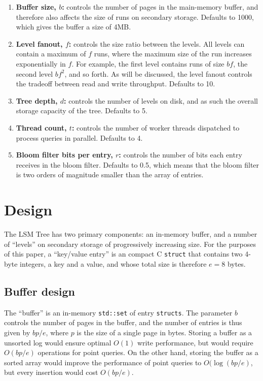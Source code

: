 \documentclass{acm}
\begin{document}
\begin{enumerate}
\item \textbf{Buffer size, $b$:} controls the number of pages in the main-memory buffer, and therefore also affects the size of runs on secondary storage. Defaults to 1000, which gives the buffer a size of 4MB.
\item \textbf{Level fanout, $f$:} controls the size ratio between the levels. All levels can contain a maximum of $f$ runs, where the maximum size of the run increases exponentially in $f$. For example, the first level contains runs of size $bf$, the second level $bf^2$, and so forth. As will be discussed, the level fanout controls the tradeoff between read and write throughput. Defaults to 10.
\item \textbf{Tree depth, $d$:} controls the number of levels on disk, and as such the overall storage capacity of the tree. Defaults to 5.
\item \textbf{Thread count, $t$:} controls the number of worker threads dispatched to process queries in parallel. Defaults to 4.
\item \textbf{Bloom filter bits per entry, $r$:} controls the number of bits each entry receives in the bloom filter. Defaults to 0.5, which means that the bloom filter is two orders of magnitude smaller than the array of entries.
\end{enumerate}

\section{Design}

The LSM Tree has two primary components: an in-memory buffer, and a number of ``levels'' on secondary storage of progressively increasing size. For the purposes of this paper, a ``key/value entry'' is an compact C \texttt{struct} that contains two 4-byte integers, a key and a value, and whose total size is therefore $e=8$ bytes.

\subsection{Buffer design}

The ``buffer'' is an in-memory \texttt{std::set} of entry \texttt{structs}. The parameter $b$ controls the number of pages in the buffer, and the number of entries is thus given by $bp/e$, where $p$ is the size of a single page in bytes. Storing a buffer as a unsorted log would ensure optimal $O(1)$ write performance, but would require $O(bp/e)$ operations for point queries. On the other hand, storing the buffer as a sorted array would improve the performance of point queries to $O(\log(bp/e)$, but every insertion would cost $O(bp/e)$.
\end{document}
